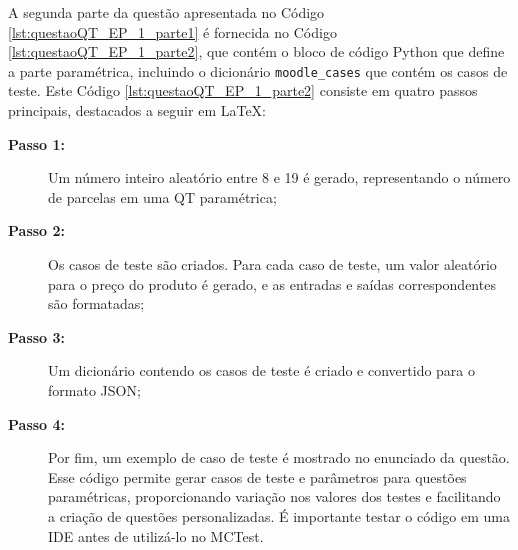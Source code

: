 A segunda parte da questão apresentada no Código \ref{lst:questaoQT_EP_1_parte1} é fornecida no Código \ref{lst:questaoQT_EP_1_parte2}, que contém o bloco de código Python que define a parte paramétrica, incluindo o dicionário \verb|moodle_cases| que contém os casos de teste.
%
Este Código \ref{lst:questaoQT_EP_1_parte2} consiste em quatro passos principais, destacados a seguir em \LaTeX:

\begin{description}
\item[\textbf{Passo 1:}] Um número inteiro aleatório entre 8 e 19 é gerado, representando o número de parcelas em uma QT paramétrica;
\item[\textbf{Passo 2:}] Os casos de teste são criados. Para cada caso de teste, um valor aleatório para o preço do produto é gerado, e as entradas e saídas correspondentes são formatadas;
\item[\textbf{Passo 3:}] Um dicionário contendo os casos de teste é criado e convertido para o formato JSON;
\item[\textbf{Passo 4:}] Por fim, um exemplo de caso de teste é mostrado no enunciado da questão. Esse código permite gerar casos de teste e parâmetros para questões paramétricas, proporcionando variação nos valores dos testes e facilitando a criação de questões personalizadas. É importante testar o código em uma IDE antes de utilizá-lo no MCTest.
\end{description}




